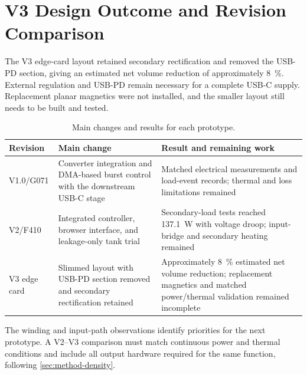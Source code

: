 \section{V3 Design Outcome and Revision Comparison}
\label{sec:res-v3-design}

The V3 edge-card layout retained secondary rectification and removed the
USB-PD section, giving an estimated net volume reduction of approximately
\SI{8}{\percent}. External regulation and USB-PD remain necessary for a
complete USB-C supply. Replacement planar magnetics were not installed,
and the smaller layout still needs to be built and tested.

\begin{table}[htbp]
\centering
\small
\caption{Main changes and results for each prototype.}
\label{tab:revision-development-outcomes}
\begin{tabularx}{\textwidth}{@{}L{0.14\textwidth}L{0.34\textwidth}Y@{}}
\toprule
Revision & Main change & Result and remaining work\\
\midrule
V1.0/G071 & Converter integration and DMA-based burst control with the downstream USB-C stage & Matched electrical measurements and load-event records; thermal and loss limitations remained\\
V2/F410 & Integrated controller, browser interface, and leakage-only tank trial & Secondary-load tests reached \SI{137.1}{\watt} with voltage droop; input-bridge and secondary heating remained\\
V3 edge card & Slimmed layout with USB-PD section removed and secondary rectification retained & Approximately \SI{8}{\percent} estimated net volume reduction; replacement magnetics and matched power/thermal validation remained incomplete\\
\bottomrule
\end{tabularx}
\end{table}
\FloatBarrier

The winding and input-path observations identify priorities for the next
prototype.
A V2--V3 comparison must match continuous power and thermal conditions and
include all output hardware required for the same function, following
\cref{sec:method-density}.
